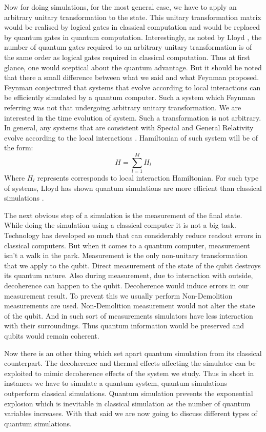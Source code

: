 \documentclass[12pt,a4paper]{report}
\begin{document}
Now for doing simulations, for the most general case, we have to apply an arbitrary unitary transformation to the state. This unitary transformation matrix would be realised by logical gates in classical computation and would be replaced by quantum gates in quantum computation. Interestingly, as noted by Lloyd \cite{lloyd}, the number of quantum gates required to an arbitrary unitary transformation is of the same order as logical gates required in classical computation. Thus at first glance, one would sceptical about the quantum advantage. But it should be noted that there a small difference between what we said and what Feynman proposed. Feynman conjectured that systems that evolve according to local interactions can be efficiently simulated by a quantum computer. Such a system which Feynman referring was not that undergoing arbitrary unitary transformation.  We are interested in the time evolution of system. Such a transformation is not arbitrary. In general, any systems that are consistent with Special and General Relativity evolve according to the local interactions \cite{lloyd}. Hamiltonian of such system will be of the form:
\begin{equation}
H= \sum_{l=1}^{M} H_{l}
\end{equation}
Where $H_{l}$ represents corresponds to local interaction Hamiltonian. For such type of systems, Lloyd has shown quantum simulations are more efficient than classical simulations \cite{lloyd}.

The next obvious step of a simulation is the measurement of the final state. While doing the simulation using a classical computer it is not a big task. Technology has developed so much that can considerably reduce readout errors in classical computers. But when it comes to a quantum computer, measurement isn’t a walk in the park. Measurement is the only non-unitary transformation that we apply to the qubit.  Direct measurement of the state of the qubit destroys its quantum nature.  Also during measurement, due to interaction with outside, decoherence can happen to the qubit. Decoherence would induce errors in our measurement result. To prevent this we usually perform Non-Demolition measurements are used. Non-Demolition measurement would not alter the state of the qubit. And in such sort of measurements simulators have less interaction with their surroundings. Thus quantum information would be preserved and qubits would remain coherent. 

Now there is an other thing which set apart quantum simulation from its classical counterpart. The decoherence and thermal effects affecting the simulator can be exploited to mimic decoherence effects of the system we study. Thus in short in instances we have to simulate a quantum system, quantum simulations outperform classical simulations. Quantum simulation prevents the exponential explosion which is inevitable in classical simulation as the number of quantum variables increases. With that said we are now going to discuss different types of quantum simulations.
\end{document}
